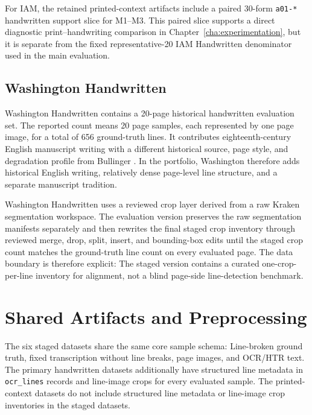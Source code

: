 For IAM, the retained printed-context artifacts include a paired 30-form \texttt{a01-*} handwritten support slice for M1--M3. This paired slice supports a direct diagnostic print--handwriting comparison in Chapter~\ref{cha:experimentation}, but it is separate from the fixed representative-20 IAM Handwritten denominator used in the main evaluation.

\subsection{Washington Handwritten}
\label{sec:data_washington}

Washington Handwritten contains a 20-page historical handwritten evaluation set. The reported count means 20 page samples, each represented by one page image, for a total of 656 ground-truth lines. It contributes eighteenth-century English manuscript writing with a different historical source, page style, and degradation profile from Bullinger . In the portfolio, Washington therefore adds historical English writing, relatively dense page-level line structure, and a separate manuscript tradition.

Washington Handwritten uses a reviewed crop layer derived from a raw Kraken segmentation workspace. The evaluation version preserves the raw segmentation manifests separately and then rewrites the final staged crop inventory through reviewed merge, drop, split, insert, and bounding-box edits until the staged crop count matches the ground-truth line count on every evaluated page. The data boundary is therefore explicit: The staged version contains a curated one-crop-per-line inventory for alignment, not a blind page-side line-detection benchmark.

\section{Shared Artifacts and Preprocessing}
\label{sec:data_representation}
\label{sec:data_handwritten_artifact_availability}
\label{sec:data_ocr_provenance}

The six staged datasets share the same core sample schema: Line-broken ground truth, fixed transcription without line breaks, page images, and OCR/HTR text. The primary handwritten datasets additionally have structured line metadata in \texttt{ocr\_lines} records and line-image crops for every evaluated sample. The printed-context datasets do not include structured line metadata or line-image crop inventories in the staged datasets.

